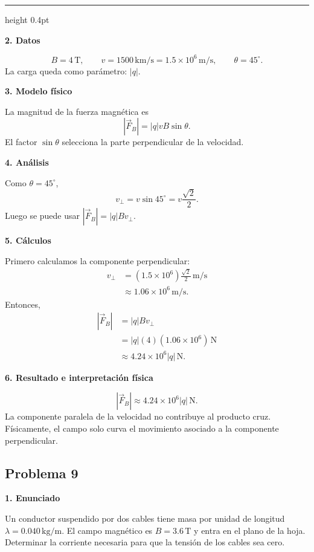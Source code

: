 \documentclass[11pt]{article}
\newcommand{\soluciontitulo}{%
  \par\medskip
  \noindent{\large\bfseries Solución.}\par
  \vspace{0.2em}\hrule height 0.4pt \vspace{0.7em}%
}
\newcommand{\paso}[1]{%
  \par\medskip
  \noindent\textbf{#1}\par
  \vspace{0.1em}%
}
\begin{document}
\soluciontitulo

\paso{2. Datos}
\begin{equation*}
    B=4\,\mathrm T,
    \qquad
    v=1500\,\mathrm{km/s}=1.5\times10^6\,\mathrm{m/s},
    \qquad
    \theta=45^\circ.
\end{equation*}
La carga queda como par\'ametro: $|q|$.

\paso{3. Modelo f\'isico}
La magnitud de la fuerza magn\'etica es
\begin{equation*}
    |\vec F_B|=|q|vB\sin\theta.
\end{equation*}
El factor $\sin\theta$ selecciona la parte perpendicular de la velocidad.

\paso{4. An\'alisis}
Como $\theta=45^\circ$,
\begin{equation*}
    v_\perp=v\sin45^\circ=v\frac{\sqrt2}{2}.
\end{equation*}
Luego se puede usar $|\vec F_B|=|q|Bv_\perp$.

\paso{5. C\'alculos}
Primero calculamos la componente perpendicular:
\begin{align*}
    v_\perp
    &=(1.5\times10^6)\frac{\sqrt2}{2}\,\mathrm{m/s}\\
    &\approx1.06\times10^6\,\mathrm{m/s}.
\end{align*}
Entonces,
\begin{align*}
    |\vec F_B|
    &=|q|Bv_\perp\\
    &=|q|(4)(1.06\times10^6)\,\mathrm N\\
    &\approx4.24\times10^6|q|\,\mathrm N.
\end{align*}

\paso{6. Resultado e interpretaci\'on f\'isica}
\begin{equation*}
    \boxed{|\vec F_B|\approx4.24\times10^6|q|\,\mathrm N}.
\end{equation*}
La componente paralela de la velocidad no contribuye al producto cruz. F\'isicamente, el campo solo curva el movimiento asociado a la componente perpendicular.

\newpage

\subsection*{Problema 9}
\paso{1. Enunciado}
Un conductor suspendido por dos cables tiene masa por unidad de longitud $\lambda=0.040\,\mathrm{kg/m}$. El campo magn\'etico es $B=3.6\,\mathrm T$ y entra en el plano de la hoja. Determinar la corriente necesaria para que la tensi\'on de los cables sea cero.
\end{document}
